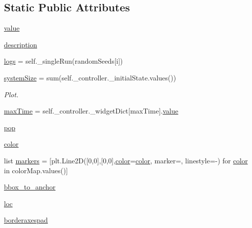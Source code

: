 \subsection*{Static Public Attributes}
\begin{DoxyCompactItemize}
\item 
\hyperlink{class_mu_mo_t_1_1_mu_mo_tview_afcc7a4b78ecd8fa7e713f8cfa0f51017}{value}
\item 
\hyperlink{class_mu_mo_t_1_1_mu_mo_tview_a2661f439a4a94ffdcd5e47ae1da0bb1d}{description}
\item 
\hyperlink{class_mu_mo_t_1_1_mu_mo_tview_a37d874d1d45bc2e5bfa013cddacb8e68}{logs} = self.\+\_\+single\+Run(random\+Seeds\mbox{[}i\mbox{]})
\item 
\hyperlink{class_mu_mo_t_1_1_mu_mo_tview_a69ffe654c8e97fdcbffcf35a1ded8157}{system\+Size} = sum(self.\+\_\+controller.\+\_\+initial\+State.\+values())
\begin{DoxyCompactList}\small\item\em Plot. \end{DoxyCompactList}\item 
\hyperlink{class_mu_mo_t_1_1_mu_mo_tview_aa820f7e11b025b06f4eeb0ad7581ad34}{max\+Time} = self.\+\_\+controller.\+\_\+widget\+Dict\mbox{[}\textquotesingle{}max\+Time\textquotesingle{}\mbox{]}.\hyperlink{class_mu_mo_t_1_1_mu_mo_tview_afcc7a4b78ecd8fa7e713f8cfa0f51017}{value}
\item 
\hyperlink{class_mu_mo_t_1_1_mu_mo_tview_a23acc33d21869c517c7eb8114b3d8072}{pop}
\item 
\hyperlink{class_mu_mo_t_1_1_mu_mo_tview_a37dbdc30935031c05304482e1be89d8f}{color}
\item 
list \hyperlink{class_mu_mo_t_1_1_mu_mo_tview_a6a57a88c0fcb681f5721c6b1bce2dd96}{markers} = \mbox{[}plt.\+Line2D(\mbox{[}0,0\mbox{]},\mbox{[}0,0\mbox{]},\hyperlink{class_mu_mo_t_1_1_mu_mo_tview_a37dbdc30935031c05304482e1be89d8f}{color}=\hyperlink{class_mu_mo_t_1_1_mu_mo_tview_a37dbdc30935031c05304482e1be89d8f}{color}, marker=\textquotesingle{}\textquotesingle{}, linestyle=\textquotesingle{}-\/\textquotesingle{}) for \hyperlink{class_mu_mo_t_1_1_mu_mo_tview_a37dbdc30935031c05304482e1be89d8f}{color} in color\+Map.\+values()\mbox{]}
\item 
\hyperlink{class_mu_mo_t_1_1_mu_mo_tview_a411167eeca51189fabe03f884c7bf92c}{bbox\+\_\+to\+\_\+anchor}
\item 
\hyperlink{class_mu_mo_t_1_1_mu_mo_tview_aeee9f371db14fda0de35d16324a167df}{loc}
\item 
\hyperlink{class_mu_mo_t_1_1_mu_mo_tview_a15c45102c35a6e8e18adffce8cfdb703}{borderaxespad}
\end{DoxyCompactItemize}
